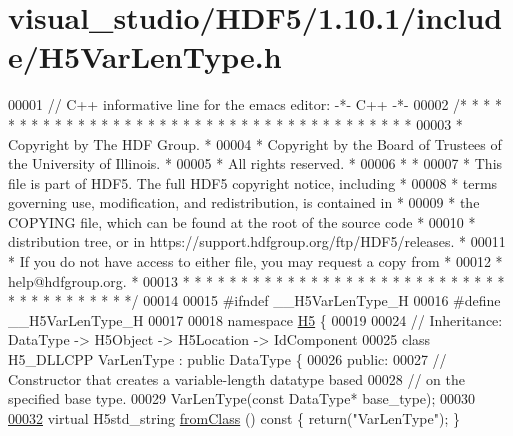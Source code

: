 \hypertarget{visual__studio_2_h_d_f5_21_810_81_2include_2_h5_var_len_type_8h_source}{}\section{visual\+\_\+studio/\+H\+D\+F5/1.10.1/include/\+H5\+Var\+Len\+Type.h}
\label{visual__studio_2_h_d_f5_21_810_81_2include_2_h5_var_len_type_8h_source}

\begin{DoxyCode}
00001 \textcolor{comment}{// C++ informative line for the emacs editor: -*- C++ -*-}
00002 \textcolor{comment}{/* * * * * * * * * * * * * * * * * * * * * * * * * * * * * * * * * * * * * * *}
00003 \textcolor{comment}{ * Copyright by The HDF Group.                                               *}
00004 \textcolor{comment}{ * Copyright by the Board of Trustees of the University of Illinois.         *}
00005 \textcolor{comment}{ * All rights reserved.                                                      *}
00006 \textcolor{comment}{ *                                                                           *}
00007 \textcolor{comment}{ * This file is part of HDF5.  The full HDF5 copyright notice, including     *}
00008 \textcolor{comment}{ * terms governing use, modification, and redistribution, is contained in    *}
00009 \textcolor{comment}{ * the COPYING file, which can be found at the root of the source code       *}
00010 \textcolor{comment}{ * distribution tree, or in https://support.hdfgroup.org/ftp/HDF5/releases.  *}
00011 \textcolor{comment}{ * If you do not have access to either file, you may request a copy from     *}
00012 \textcolor{comment}{ * help@hdfgroup.org.                                                        *}
00013 \textcolor{comment}{ * * * * * * * * * * * * * * * * * * * * * * * * * * * * * * * * * * * * * * */}
00014 
00015 \textcolor{preprocessor}{#ifndef \_\_H5VarLenType\_H}
00016 \textcolor{preprocessor}{#define \_\_H5VarLenType\_H}
00017 
00018 \textcolor{keyword}{namespace }\hyperlink{namespace_h5}{H5} \{
00019 
00024 \textcolor{comment}{//  Inheritance: DataType -> H5Object -> H5Location -> IdComponent}
00025 \textcolor{keyword}{class }H5\_DLLCPP VarLenType : \textcolor{keyword}{public} DataType \{
00026    \textcolor{keyword}{public}:
00027         \textcolor{comment}{// Constructor that creates a variable-length datatype based}
00028         \textcolor{comment}{// on the specified base type.}
00029         VarLenType(\textcolor{keyword}{const} DataType* base\_type);
00030 
\hyperlink{class_h5_1_1_var_len_type_a781d7c99f66c97e3b09039151ce9158c}{00032}         \textcolor{keyword}{virtual} H5std\_string \hyperlink{class_h5_1_1_var_len_type_a781d7c99f66c97e3b09039151ce9158c}{fromClass} ()\textcolor{keyword}{ const }\{ \textcolor{keywordflow}{return}(\textcolor{stringliteral}{"VarLenType"}); \}

\end{DoxyCode}
